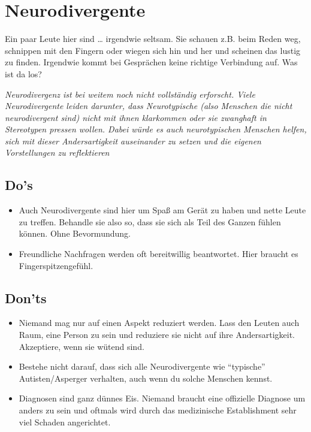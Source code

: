 \documentclass[10pt]{leaflet}
\begin{document}
\section{Neurodivergente}
\label{sec-3}
Ein paar Leute hier sind \ldots{} irgendwie seltsam. Sie schauen
z.B. beim Reden weg, schnippen mit den Fingern oder wiegen sich hin
und her und scheinen das lustig zu finden. Irgendwie kommt bei
Gesprächen keine richtige Verbindung auf. Was ist da los?


\emph{Neurodivergenz ist bei weitem noch nicht vollständig
  erforscht. Viele Neurodivergente leiden darunter, dass Neurotypische
  (also Menschen die nicht neurodivergent sind) nicht mit ihnen
  klarkommen oder sie zwanghaft in Stereotypen pressen wollen. Dabei
  würde es auch neurotypischen Menschen helfen, sich mit dieser
  Andersartigkeit auseinander zu setzen und die eigenen Vorstellungen
  zu reflektieren}

\subsection{Do's}
\label{sec-3-1}
\begin{itemize}
\item Auch Neurodivergente sind hier um Spaß am Gerät zu haben und
  nette Leute zu treffen. Behandle sie also so, dass sie sich als Teil
  des Ganzen fühlen können. Ohne Bevormundung.
\item Freundliche Nachfragen werden oft bereitwillig beantwortet. Hier
  braucht es Fingerspitzengefühl.
\end{itemize}

\subsection{Don'ts}
\label{sec-3-2}
\begin{itemize}
\item Niemand mag nur auf einen Aspekt reduziert werden. Lass den
  Leuten auch Raum, eine Person zu sein und reduziere sie nicht auf
  ihre Andersartigkeit. Akzeptiere, wenn sie wütend sind.
\item Bestehe nicht darauf, dass sich alle Neurodivergente wie
  ``typische'' Autisten/Asperger verhalten, auch wenn du solche
  Menschen kennst.
\item Diagnosen sind ganz dünnes Eis. Niemand braucht eine offizielle
  Diagnose um anders zu sein und oftmals wird durch das medizinische
  Establishment sehr viel Schaden angerichtet.
\end{itemize}
\end{document}
